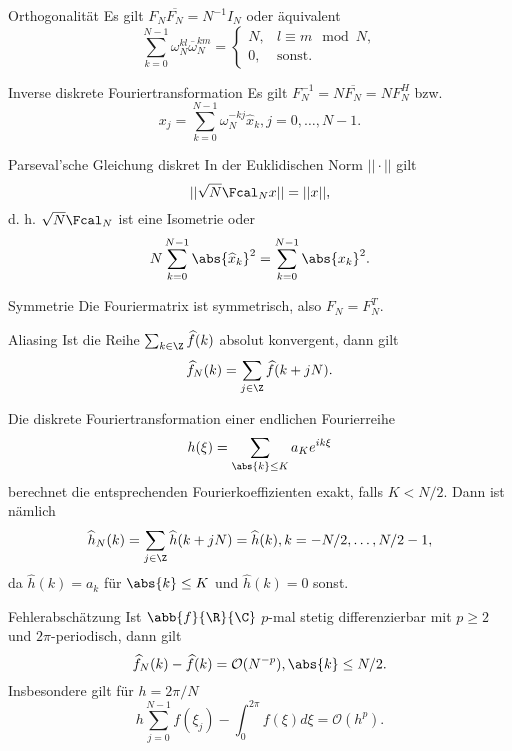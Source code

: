 \begin{karte}{Orthogonalität}
    Es gilt \( F_N \overline{F_N} = N^{-1} I_N \) 
    oder äquivalent 
    \[ \sum_{k=0}^{N-1} \omega_N^{kl} \overline{\omega}_N^{km} = 
    \begin{cases}
        N, & l \equiv m \mod N, \\
        0, & \text{sonst}.
    \end{cases} \]
\end{karte}

\begin{karte}{Inverse diskrete Fouriertransformation}
    Es gilt \( F_N^{-1} = N \overline{F_N} = N F_N^H \) bzw. 
    \[ x_j = \sum_{k=0}^{N-1} \omega_N^{-kj} \widehat{x}_k, j=0,\ldots, N-1. \]
\end{karte}

\begin{karte}{Parseval'sche Gleichung diskret}
    In der Euklidischen Norm \( ||\cdot|| \) gilt 
    \[ || \sqrt{N} \Fcal_N x||= ||x||, \]
    d. h. \( \sqrt{N} \Fcal_N \) ist eine Isometrie oder 
    \[ N \sum_{k=0}^{N-1} \abs{\widehat{x}_k}^2 = \sum_{k=0}^{N-1} \abs{x_k}^2. \]
\end{karte}

\begin{karte}{Symmetrie}
    Die Fouriermatrix ist symmetrisch, also 
    \( F_N = F_N^T \). 
\end{karte}

\begin{karte}{Aliasing}
    Ist die Reihe \(\sum_{k\in\Z} \widehat{f}(k)\) absolut konvergent, dann gilt 
    \[ \widehat{f}_N(k) = \sum_{j\in\Z} \widehat{f}(k+jN). \]

    Die diskrete Fouriertransformation einer endlichen Fourierreihe 
    \[ h(\xi) = \sum_{\abs{k}\leq K} a_K e^{ik\xi} \]
    berechnet die entsprechenden Fourierkoeffizienten exakt, falls \(K<N/2\). 
    Dann ist nämlich 
    \[ \widehat{h}_N(k) = \sum_{j\in\Z} \widehat{h}(k+jN) = \widehat{h}(k), k = -N/2,\ldots, N/2-1, \]
    da \(\widehat{h}(k) = a_k\) für \(\abs{k} \leq K\) und \(\widehat{h}(k) = 0\) sonst.
\end{karte}

\begin{karte}{Fehlerabschätzung}
    Ist \(\abb{f}{\R}{\C}\) \(p\)-mal stetig differenzierbar mit \(p\geq 2\) und 
    \(2\pi\)-periodisch, dann gilt 
    \[ \widehat{f}_N(k) - \widehat{f}(k) = \mathcal{O}(N^{-p}), \abs{k} \leq N/2. \]
    Insbesondere gilt für \(h=2\pi/N\)
    \[ h \sum_{j=0}^{N-1} f(\xi_j) - \int_0^{2\pi} f(\xi)d\xi = \mathcal{O}(h^p). \]
\end{karte}

